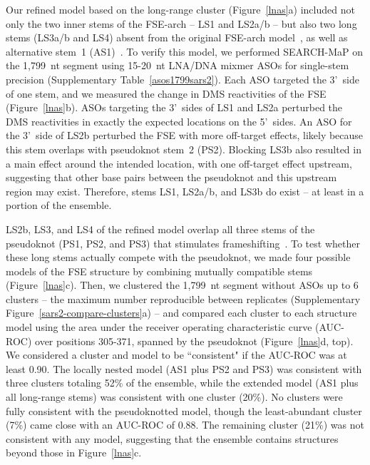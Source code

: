 \documentclass[main.tex]{subfiles}
\begin{document}
Our refined model based on the long-range cluster (Figure~\ref{lnas}a) included not only the two inner stems of the FSE-arch -- LS1 and LS2a/b -- but also two long stems (LS3a/b and LS4) absent from the original FSE-arch model~\cite{Ziv2020}, as well as alternative stem~1 (AS1)~\cite{Lan2022}.
To verify this model, we performed SEARCH-MaP on the 1,799~nt segment using 15-20~nt LNA/DNA mixmer ASOs for single-stem precision (Supplementary Table~\ref{asos1799sars2}).
Each ASO targeted the 3'~side of one stem, and we measured the change in DMS reactivities of the FSE (Figure~\ref{lnas}b).
ASOs targeting the 3'~sides of LS1 and LS2a perturbed the DMS reactivities in exactly the expected locations on the 5'~sides.
An ASO for the 3'~side of LS2b perturbed the FSE with more off-target effects, likely because this stem overlaps with pseudoknot stem~2 (PS2).
Blocking LS3b also resulted in a main effect around the intended location, with one off-target effect upstream, suggesting that other base pairs between the pseudoknot and this upstream region may exist.
Therefore, stems LS1, LS2a/b, and LS3b do exist -- at least in a portion of the ensemble.

LS2b, LS3, and LS4 of the refined model overlap all three stems of the pseudoknot (PS1, PS2, and PS3) that stimulates frameshifting~\cite{KZhang2021}.
To test whether these long stems actually compete with the pseudoknot, we made four possible models of the FSE structure by combining mutually compatible stems (Figure~\ref{lnas}c).
Then, we clustered the 1,799~nt segment without ASOs up to 6 clusters -- the maximum number reproducible between replicates (Supplementary Figure~\ref{sars2-compare-clusters}a) -- and compared each cluster to each structure model using the area under the receiver operating characteristic curve (AUC-ROC) over positions 305-371, spanned by the pseudoknot (Figure~\ref{lnas}d, top).
We considered a cluster and model to be ``consistent" if the AUC-ROC was at least 0.90.
The locally nested model (AS1 plus PS2 and PS3) was consistent with three clusters totaling 52\% of the ensemble, while the extended model (AS1 plus all long-range stems) was consistent with one cluster (20\%).
No clusters were fully consistent with the pseudoknotted model, though the least-abundant cluster (7\%) came close with an AUC-ROC of 0.88.
The remaining cluster (21\%) was not consistent with any model, suggesting that the ensemble contains structures beyond those in Figure~\ref{lnas}c.
\end{document}
